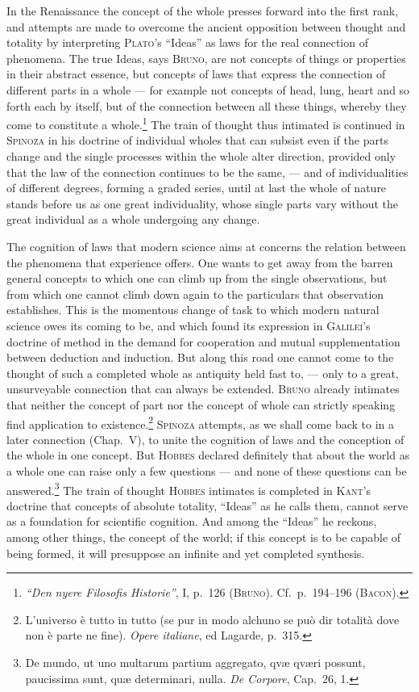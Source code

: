 \documentclass[12pt]{book}
\newcommand{\opage}[1]{\marginnote{\footnotesize\textit{[#1]}}}
\begin{document}
In the Renaissance the concept of the whole presses forward into the first rank,
and attempts are made to overcome the ancient opposition between thought and
totality by interpreting \textsc{Plato}'s ``Ideas'' as laws for the real
connection of phenomena. The true Ideas, says \textsc{Bruno}, are not concepts
of things or properties in their abstract essence, but concepts of laws that
express the connection of different parts in a whole --- for example not
concepts of head, lung, heart and so forth each by itself, but of the connection
between all these things, whereby they come to constitute a
whole.\footnote{\textit{``Den nyere Filosofis Historie''}, I, p.\ 126
(\textsc{Bruno}). Cf.\ p.\ 194--196 (\textsc{Bacon}).} The train of thought thus
intimated is continued in \textsc{Spinoza} in his doctrine of individual wholes
that can subsist even if the parts change and the \opage{21}single processes within the
whole alter direction, provided only that the law of the connection continues to
be the same, --- and of individualities of different degrees, forming a graded
series, until at last the whole of nature stands before us as one great
individuality, whose single parts vary without the great individual as a whole
undergoing any change.

The cognition of laws that modern science aims at concerns the relation between
the phenomena that experience offers. One wants to get away from the barren
general concepts to which one can climb up from the single observations, but
from which one cannot climb down again to the particulars that observation
establishes. This is the momentous change of task to which modern natural
science owes its coming to be, and which found its expression in
\textsc{Galilei}'s doctrine of method in the demand for cooperation and mutual
supplementation between deduction and induction. But along this road one cannot
come to the thought of such a completed whole as antiquity held fast to, ---
only to a great, unsurveyable connection that can always be extended.
\textsc{Bruno} already intimates that neither the concept of part nor the
concept of whole can strictly speaking find application to
existence.\footnote{L'universo è tutto in tutto (se pur in modo alchuno se può
dir totalità dove non è parte ne fine). \textit{Opere italiane}, ed Lagarde,
p.\ 315.} \textsc{Spinoza} attempts, as we shall come back to in a later
connection (Chap.\ V), to unite the cognition of laws and the conception of the
whole in one concept. But \textsc{Hobbes} declared definitely that about the
world as a whole one can raise only a few questions --- and none of these
questions can be answered.\footnote{De mundo, ut uno multarum partium aggregato,
qvæ qværi possunt, paucissima sunt, quæ determinari, nulla. \textit{De Corpore},
Cap.\ 26, 1.} The train of thought \textsc{Hobbes} intimates is completed in
\textsc{Kant}'s doctrine that concepts of absolute totality, ``Ideas'' as he
calls them, cannot serve as a foundation for scientific cognition. And among the
``Ideas'' he reckons, among other things, the concept of the world; if this
concept is to be capable of being formed, it will presuppose an infinite and yet
completed synthesis.
\end{document}
